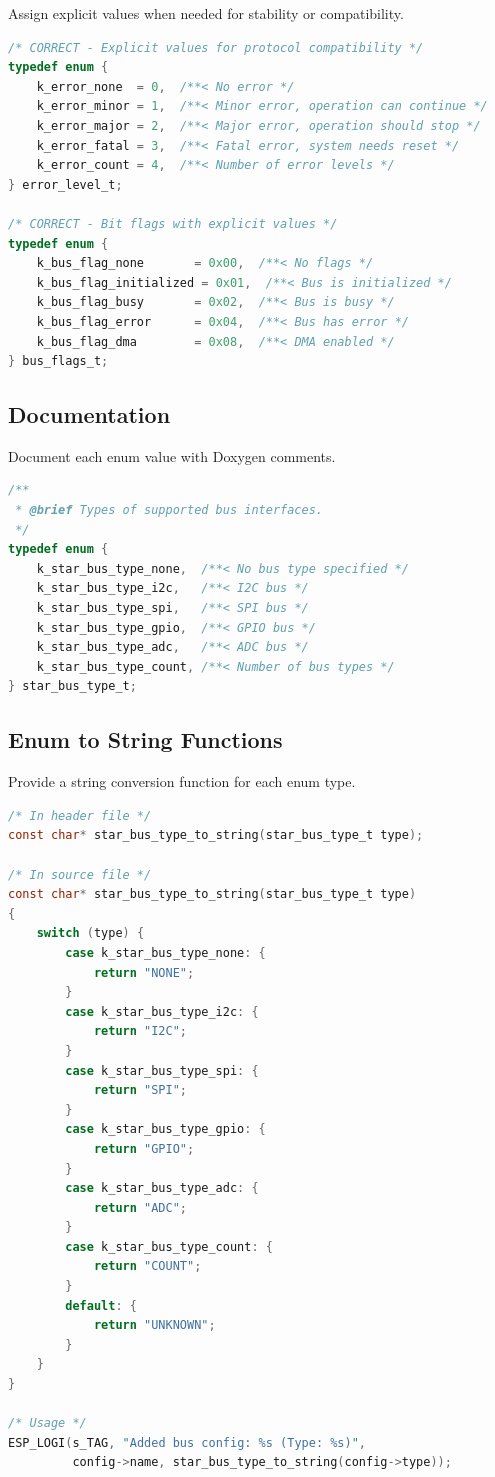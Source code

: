 Assign explicit values when needed for stability or compatibility.

\begin{lstlisting}[language=C]
/* CORRECT - Explicit values for protocol compatibility */
typedef enum {
    k_error_none  = 0,  /**< No error */
    k_error_minor = 1,  /**< Minor error, operation can continue */
    k_error_major = 2,  /**< Major error, operation should stop */
    k_error_fatal = 3,  /**< Fatal error, system needs reset */
    k_error_count = 4,  /**< Number of error levels */
} error_level_t;

/* CORRECT - Bit flags with explicit values */
typedef enum {
    k_bus_flag_none       = 0x00,  /**< No flags */
    k_bus_flag_initialized = 0x01,  /**< Bus is initialized */
    k_bus_flag_busy       = 0x02,  /**< Bus is busy */
    k_bus_flag_error      = 0x04,  /**< Bus has error */
    k_bus_flag_dma        = 0x08,  /**< DMA enabled */
} bus_flags_t;
\end{lstlisting}

\subsection{Documentation}

Document each enum value with Doxygen comments.

\begin{lstlisting}[language=C]
/**
 * @brief Types of supported bus interfaces.
 */
typedef enum {
    k_star_bus_type_none,  /**< No bus type specified */
    k_star_bus_type_i2c,   /**< I2C bus */
    k_star_bus_type_spi,   /**< SPI bus */
    k_star_bus_type_gpio,  /**< GPIO bus */
    k_star_bus_type_adc,   /**< ADC bus */
    k_star_bus_type_count, /**< Number of bus types */
} star_bus_type_t;
\end{lstlisting}

\subsection{Enum to String Functions}

Provide a string conversion function for each enum type.

\begin{lstlisting}[language=C]
/* In header file */
const char* star_bus_type_to_string(star_bus_type_t type);

/* In source file */
const char* star_bus_type_to_string(star_bus_type_t type)
{
    switch (type) {
        case k_star_bus_type_none: {
            return "NONE";
        }
        case k_star_bus_type_i2c: {
            return "I2C";
        }
        case k_star_bus_type_spi: {
            return "SPI";
        }
        case k_star_bus_type_gpio: {
            return "GPIO";
        }
        case k_star_bus_type_adc: {
            return "ADC";
        }
        case k_star_bus_type_count: {
            return "COUNT";
        }
        default: {
            return "UNKNOWN";
        }
    }
}

/* Usage */
ESP_LOGI(s_TAG, "Added bus config: %s (Type: %s)",
         config->name, star_bus_type_to_string(config->type));
\end{lstlisting}


